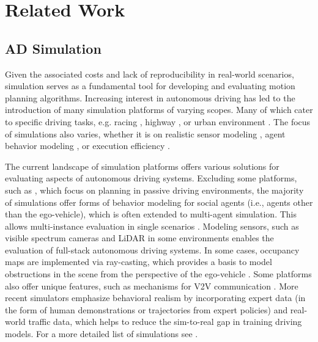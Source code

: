 \section{Related Work}
\subsection{AD Simulation}
Given the associated costs and lack of reproducibility in real-world scenarios, simulation serves as a fundamental tool for developing and evaluating motion planning algorithms. Increasing interest in autonomous driving has led to the introduction of many simulation platforms of varying scopes. Many of which cater to specific driving tasks, e.g. racing \cite{wymann2000torcs}, highway \cite{leurent2018environment}, or urban environment \cite{gulino2024waymax}. The focus of simulations also varies, whether it is on realistic sensor modeling \cite{muller2018sim4cv,dosovitskiy2017carla}, agent behavior modeling \cite{zhou2020smarts,sun2022intersim}, or execution efficiency \cite{gulino2024waymax,scibior2021imagining}.

The current landscape of simulation platforms offers various solutions for evaluating aspects of autonomous driving systems. Excluding some platforms, such as \cite{martinez2017beyond,leurent2018environment,amini2022vista}, which focus on planning in passive driving environments, the majority of simulations offer forms of behavior modeling for social agents (i.e., agents other than the ego-vehicle), which is often extended to multi-agent simulation. This allows multi-instance evaluation in single scenarios \cite{cai2020summit, palanisamy2020multi, craig_quiter_2020,santara2021madras, althoff2017commonroad}. Modeling sensors, such as visible spectrum cameras and LiDAR in some environments \cite{caesar2021nuplan,li2022metadrive, dosovitskiy2017carla, muller2018sim4cv, sun2022intersim, scibior2021imagining} enables the evaluation of full-stack autonomous driving systems. In some cases, occupancy maps are implemented via ray-casting, which provides a basis to model obstructions in the scene from the perspective of the ego-vehicle \cite{vinitsky2022nocturne}. Some platforms also offer unique features, such as mechanisms for V2V communication \cite{palanisamy2020multi}. More recent simulators emphasize behavioral realism \cite{xu2023bits, gulino2024waymax, vinitsky2022nocturne, li2022metadrive} by incorporating expert data (in the form of human demonstrations or trajectories from expert policies) and real-world traffic data, which helps to reduce the sim-to-real gap in training driving models. For a more detailed list of simulations see \cite{Li_2024_tiv}.

